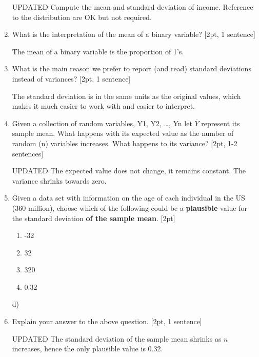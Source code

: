 \documentclass[answers]{exam}
\begin{document}
\begin{enumerate}
\begin{solution}
    UPDATED Compute the mean and standard deviation of income. Reference to the distribution are OK but not required. 
\end{solution}
	\item What is the interpretation of the mean of a binary variable? [2pt, 1 sentence]
\begin{solution}
    The mean of a binary variable is the proportion of 1's.
\end{solution}

\newpage
	\item What is the main reason we prefer to report (and read) standard deviations instead of variances? [2pt, 1 sentence]
\begin{solution}
    The standard deviation is in the same units as the original values, which makes it much easier to work with and easier to interpret.
\end{solution}

	\item Given a collection of random variables, Y1, Y2, …, Yn let $\overline{Y}$ represent its sample mean. What happens with its expected value as the number of random (n) variables increases. What happens to its variance? [2pt, 1-2 sentences]
\begin{solution}
    UPDATED The expected value does not change, it remains constant. The variance shrinks towards zero. 
\end{solution}

\item Given a data set with information on the age of each individual in the US (360 million), choose which of the following could be a \textbf{plausible} value for the standard deviation\textbf{ of the sample mean}. [2pt]
\begin{enumerate}
    \item -32
    \item 32
    \item 320
    \item 0.32
\end{enumerate}
\begin{solution}
d)
\end{solution}

\item Explain your answer to the above question. [2pt, 1 sentence]
\begin{solution}
  UPDATED The standard deviation of the sample mean shrinks as $n$ increases, hence the only plausible value is 0.32. 
\end{solution}


\end{enumerate}
\end{document}
